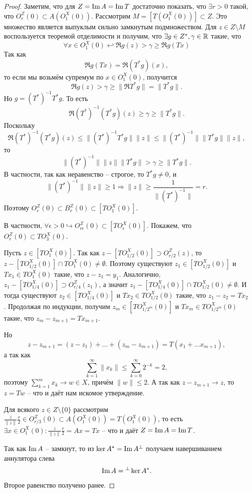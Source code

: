 \begin{proof}
    Заметим, что для $Z = \operatorname{Im} A = \operatorname{Im} T$ достаточно показать, что $\exists r > 0$ такой, что $O^Z_r(0) \subset A(O_1^X(0))$.
    Рассмотрим $M = [T(O_1^X(0))] \subset Z$.
    Это множество является выпуклым сильно замкнутым подмножеством.
    Для $z \in Z \setminus M$ воспользуется теоремой отделимости и получим, что $\exists g \in Z^*, \gamma \in \mathbb{R}$ такие, что 
    \[
        \forall x \in O_1^X(0)\hookleftarrow \Re g(z) > \gamma \geq \Re g(Tx)
    \]
    Так как 
    \[
        \Re g(Tx) = \Re (T^* g)(x),
    \]
    то если мы возьмём супремум по $x \in O_1^X(0)$, получится
    \[
        \Re g(z) > \gamma \geq \| \Re T^* g\| = \|T^* g\|.
    \]
    Но $g = (T^*)^{-1}T^* g$.
    То есть
    \[
        \Re (T^*)^{-1}(T^* g)(z) \geq \gamma \geq \|T^* g\|.
    \]
    Поскольку 
    \[
        \Re (T^*)^{-1}(T^* g)(z) \leq \|(T^*)^{-1}T^* g\|\|z\| \leq \|(T^*)^{-1}\|\|T^* g\|\|z\|,
    \]
    то 
    \[
        \|(T^*)^{-1}\|\|z\|\|T^* g\| > \gamma \geq \|T^*g\|.
    \]
    В частности, так как неравенство -- строгое, то $T^* g \neq 0$, и
    \[
        \|(T^*)^{-1}\|\|z\| \geq 1 \Rightarrow \|z\| \geq \frac{1}{\|(T^*)^{-1}\|} = r.
    \]
    Поэтому $O_r^Z(0) \subset B^Z_r(0) \subset [TO_1^X(0)]$.
    
    В частности, $\forall \epsilon > 0 \hookrightarrow O_{r\epsilon}^Z(0) \subset [TO_{\epsilon}^X(0)]$.
    Покажем, что $O_r^Z(0) \subset TO_3^X(0)$.

    Пусть $z \in [TO_1^X(0)]$.
    Так как $z - [TO_{1/2}^X(0)] \supset O_{r/2}^Z(z)$, то $z - [TO_{1/2}^X(0)] \cap TO_1^X(0) \neq \emptyset$. Поэтому существуют $z_1 \in [TO_{1/2}^X(0)]$ и $Tx_1 \in TO_{1}^X(0)$ такие, что $z - z_1 = y_1$.
    Аналогично, $z_1 - [TO_{1/4}^X(0)] \supset O_{r/4}^{Z}(z_1)$, а значит $z_1 - [TO_{1/4}^X(0)] \cap TO_{1/2}^X(0) \neq \emptyset$.
    И тогда существуют $z_2 \in [TO_{1/4}^X(0)]$ и $Tx_2 \in TO_{1/2}^X(0)$ такие, что $z_1 - z_2 = Tx_2$.
    Продолжая по индукции, получим $z_m \in [TO_{1/2^m}^X(0)]$ и $Tx_m \in TO^X_{1/2^m}(0)$ такие, что $z_m - z_{m + 1} = Tx_{m + 1}$.

    Но
    \[
        z - z_{m + 1} = (z - z_1) + \ldots + (z_m - z_{m + 1}) = T(x_1 + \ldots x_{m + 1}),
    \]
    а так как
    \[
        \sum_{k = 1}^{\infty} \|x_k\| \leq \sum_{k = 0}^{\infty} 2^{-k}  = 2,
    \]
    поэтому $\sum_{k = 1}^{m} x_k \rightarrow w \in X$, причём $\|w\| \leq 2$.
    А так как $z - z_{m + 1} \rightarrow z$, то $z = Tw$ -- что и даёт нам искомое утверждение.

    Для всякого $z \in Z \setminus \{0\}$ рассмотрим $\frac{z}{\|z\|}\frac{r}{2} \in O^Z_{r/3}(0) \subset A(O_1^X(0)) = T(O_1^X(0))$, то есть $\exists x \in O_1^X(0)\colon \frac{z}{\|z\|}\frac{r}{2} = Ax = Tx$ -- что и даёт $Z = \operatorname{Im} A = \operatorname{Im} T$.

    Так как $\operatorname{Im} A$ -- замкнут, то из $\ker A^* = \operatorname{Im} A^\perp$ получаем навершиванием аннулятора слева
    \[
        \operatorname{Im} A = {}^\perp \ker A^*.
    \]
    Второе равенство получено ранее.
\end{proof}
